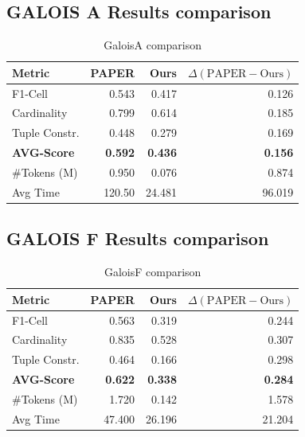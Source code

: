 \subsection{GALOIS A Results comparison}

\begin{table}[H]
\centering
\begin{tabular}{lrrr}
\hline
Metric & PAPER & Ours & $\Delta(\text{PAPER} - \text{Ours})$ \\
\hline
F1-Cell       & 0.543 & 0.417 & 0.126 \\
Cardinality   & 0.799 & 0.614 & 0.185 \\
Tuple Constr. & 0.448 & 0.279 & 0.169 \\
\textbf{AVG-Score} & \textbf{0.592} & \textbf{0.436} & \textbf{0.156} \\
\#Tokens (M)  & 0.950 & 0.076    &  0.874     \\
Avg Time      & 120.50 & 24.481   &  96.019     \\
\hline
\end{tabular}
\caption{GaloisA comparison}
\label{galoisA_results}
\end{table}

\subsection{GALOIS F Results comparison}

\begin{table}[H]
\centering
\begin{tabular}{lrrr}
\hline
Metric & PAPER & Ours & $\Delta(\text{PAPER} - \text{Ours})$ \\
\hline
F1-Cell       & 0.563 & 0.319 & 0.244 \\
Cardinality   & 0.835 & 0.528 & 0.307 \\
Tuple Constr. & 0.464 & 0.166 & 0.298 \\
\textbf{AVG-Score} & \textbf{0.622} & \textbf{0.338} & \textbf{0.284} \\
\#Tokens (M)  & 1.720 &   0.142   &  1.578     \\
Avg Time      & 47.400 &  26.196   &  21.204     \\
\hline
\end{tabular}
\caption{GaloisF comparison}
\label{galoisF_results}
\end{table}

